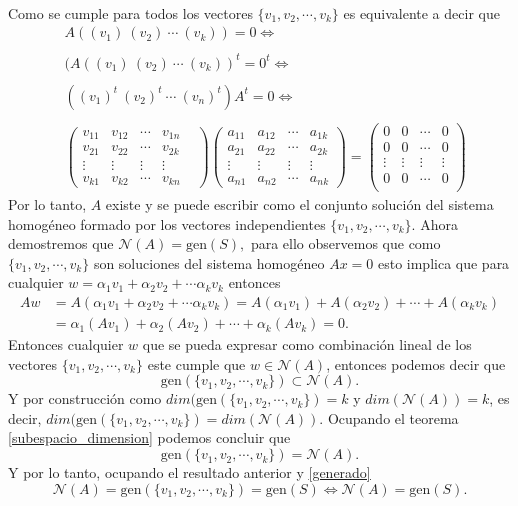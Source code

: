 \documentclass[11pt,letterpaper]{article}
\newcommand{\mcN}{\mathcal{N}}
\newcommand{\gen}{\text{gen}}
\begin{document}
\begin{enumerate}
\begin{align*}
\end{align*}
Como se cumple para todos los vectores  $\{v_{1}, v_{2}, \cdots, v_k \}$ es equivalente a decir que 
\begin{align*}
&A((v_1)\ (v_2)\ \cdots\ (v_k))=0\Leftrightarrow\\ \\
&(A((v_1)\ (v_2)\ \cdots\ (v_k))^{t}=0^{t}\Leftrightarrow\\ \\
&((v_1)^t\ (v_2)^t\ \cdots\ (v_n)^t)A^{t}=0\Leftrightarrow\\ \\
&\begin{pmatrix}
v_{11}& v_{12}& \cdots&v_{1n}\\
v_{21}&v_{22}& \cdots&v_{2k} \\
\vdots&\vdots&\vdots&\vdots \\
v_{k1}&v_{k2} & \cdots&v_{kn}& 
\end{pmatrix}\begin{pmatrix}
a_{11}&a_{12}& \cdots&a_{1k}\\
a_{21}&a_{22}& \cdots&a_{2k} \\
\vdots&\vdots&\vdots&\vdots \\
a_{n1}&a_{n2} & \cdots&a_{nk}
\end{pmatrix}
=
\begin{pmatrix}
0&0& \cdots&0\\
0&0& \cdots&0\\
\vdots&\vdots&\vdots&\vdots \\
0&0& \cdots&0\\
\end{pmatrix}
\end{align*}
Por lo tanto, $A$ existe y se puede escribir como el conjunto solución del sistema homogéneo formado por los vectores independientes $\{v_{1}, v_{2}, \cdots, v_k \}$. Ahora demostremos que $\mcN(A)=\gen(S),$ para ello observemos que como $\{v_{1}, v_{2}, \cdots, v_k \}$ son soluciones del sistema homogéneo $Ax=0$ esto implica que para cualquier $w=\alpha_1v_{1}+\alpha_2v_2+\cdots \alpha_kv_{k}$ entonces  
\begin{align*}
Aw&=A(\alpha_1v_{1}+\alpha_2v_2+\cdots \alpha_kv_{k})=
A(\alpha_1v_{1})+A(\alpha_2v_{2})+\cdots+A(\alpha_kv_{k})\\
&=\alpha_1(Av_1)+\alpha_2(Av_2)+\cdots+\alpha_k(Av_k)=0.
\end{align*}
Entonces cualquier $w$ que se pueda expresar como combinación lineal de los vectores $\{v_{1}, v_{2}, \cdots, v_k \}$ este cumple que $w\in \mcN(A)$, entonces podemos decir que 
$$\gen(\{v_{1}, v_{2}, \cdots, v_k \})\subset \mcN(A).$$
Y por construcción como $dim(\gen(\{v_{1}, v_{2}, \cdots, v_k \})=k$ y $dim(\mcN(A))=k$, es decir, $dim(\gen(\{v_{1}, v_{2}, \cdots, v_k \})=dim(\mcN(A))$. Ocupando el teorema \ref{subespacio_dimension} podemos concluir que
$$\gen(\{v_{1}, v_{2}, \cdots, v_k \})= \mcN(A).$$
Y por lo tanto, ocupando el resultado anterior y \ref{generado}
$$\mcN(A)=\gen(\{v_{1}, v_{2}, \cdots, v_k \})=\gen(S)\Leftrightarrow \mcN(A)=\gen(S).$$


\end{enumerate}
\end{document}
